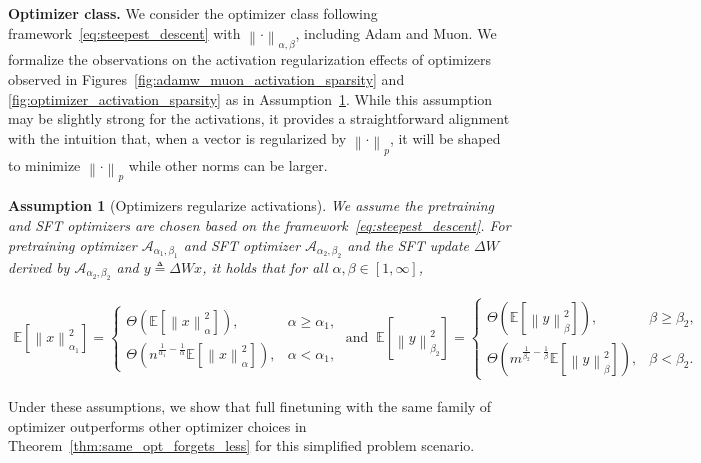 \documentclass{article}
\newtheorem{assumption}{Assumption}
\theoremstyle{remark}
\newcommand{\Norm}[1]{\left\|#1\right\|}
\newcommand{\EE}{\mathbb{E}}
\newcommand{\cA}{\mathcal{A}}
\begin{document}
\textbf{Optimizer class.} We consider the optimizer class following framework~\eqref{eq:steepest_descent} with $\Norm{\cdot}_{\alpha,\beta}$, including Adam and Muon. We formalize the observations on the activation regularization effects of optimizers observed in Figures~\ref{fig:adamw_muon_activation_sparsity} and \ref{fig:optimizer_activation_sparsity} as in Assumption~\ref{asm:optimizer_choice_activation_property}. While this assumption may be slightly strong for the activations, it provides a straightforward alignment with the intuition that, when a vector is regularized by $\Norm{\cdot}_p$, it will be shaped to minimize $\Norm{\cdot}_p$ while other norms can be larger.

\begin{assumption}[Optimizers regularize activations]\label{asm:optimizer_choice_activation_property}
    We assume the pretraining and SFT optimizers are chosen based on the framework~\eqref{eq:steepest_descent}. For pretraining optimizer $\cA_{\alpha_1,\beta_1}$ and SFT optimizer $\cA_{\alpha_2,\beta_2}$ and the SFT update $\Delta W$ derived by $\cA_{\alpha_2,\beta_2}$ and $y\triangleq \Delta W x$, it holds that for all $\alpha,\beta \in [1,\infty]$, 
    \begin{small}
    \begin{align*}
        \EE\left[\Norm{x}_{\alpha_1}^2 \right] = \begin{cases}
            \Theta \left( \EE\left[ \Norm{x}_{\alpha}^2 \right] \right), & \alpha \ge \alpha_1, \\
            \Theta \left( n^{\frac{1}{\alpha_1} - \frac{1}{\alpha}} \EE\left[ \Norm{x}_{\alpha}^2 \right] \right), & \alpha < \alpha_1 ,
        \end{cases} \; \text{and} \; \;
        \EE\left[ \Norm{y}_{\beta_2}^2 \right] = \begin{cases}
            \Theta \left( \EE\left[ \Norm{y}_{\beta}^2 \right] \right), & \beta \ge \beta_2, \\
            \Theta \left( m^{\frac{1}{\beta_2} - \frac{1}{\beta}} \EE\left[ \Norm{y}_{\beta}^2 \right] \right), & \beta < \beta_2 .
        \end{cases}
    \end{align*}
    \end{small}

\end{assumption}



Under these assumptions, we show that full finetuning with the same family of optimizer outperforms other optimizer choices in Theorem~\ref{thm:same_opt_forgets_less} for this simplified problem scenario. 
\end{document}

